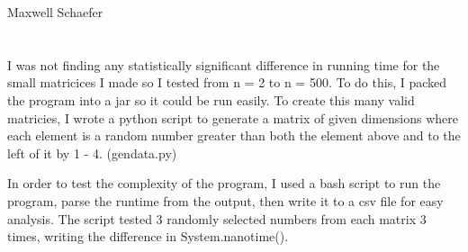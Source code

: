 \documentclass{article}
\begin{document}
    Maxwell Schaefer

    \section*{}
        I was not finding any statistically significant difference in running time for the small matricices I made so I tested from n = 2 to n = 500. To do this, I packed the program into a jar so it could be run easily. To create this many valid matricies, I wrote a python script to generate a matrix of given dimensions where each element is a random number greater than both the element above and to the left of it by 1 - 4. (gendata.py)
            
        In order to test the complexity of the program, I  used a bash script to run the program, parse the runtime from the output, then write it to a csv file for easy analysis. The script tested 3 randomly selected numbers from each matrix 3 times, writing the difference in System.nanotime().
\end{document}
